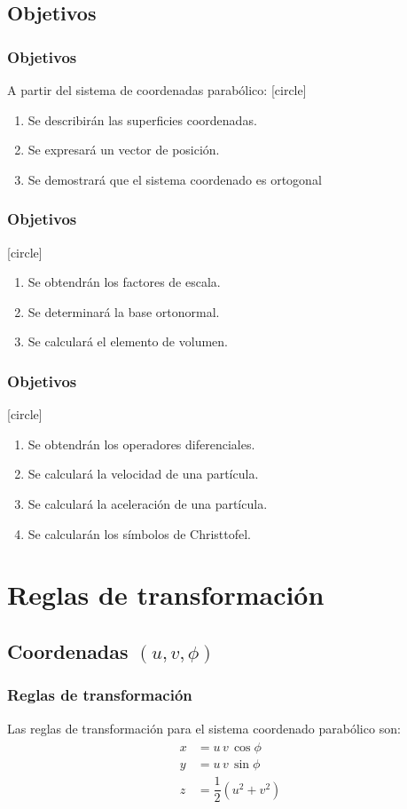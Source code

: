 \subsection{Objetivos}
\begin{frame}
\frametitle{Objetivos}
A partir del sistema de coordenadas parabólico:
[circle]
\begin{enumerate}[<+->]
\item Se describirán las superficies coordenadas.
\item Se expresará un vector de posición.
\item Se demostrará que el sistema coordenado es ortogonal
\seti
\end{enumerate}
\end{frame}
\begin{frame}
\frametitle{Objetivos}
[circle]
\begin{enumerate}[<+->]
\conti
\item Se obtendrán los factores de escala.
\item Se determinará la base ortonormal.
\item Se calculará el elemento de volumen.
\seti
\end{enumerate}
\end{frame}
\begin{frame}
\frametitle{Objetivos}
[circle]
\begin{enumerate}[<+->]
\conti
\item Se obtendrán los operadores diferenciales.
\item Se calculará la velocidad de una partícula.
\item Se calculará la aceleración de una partícula.
\item Se calcularán los símbolos de Christtofel.
\end{enumerate}
\end{frame}
\section{Reglas de transformación}
\subsection{Coordenadas \texorpdfstring{$(u, v, \phi)$}{(u, v, f)}}
\begin{frame}
\frametitle{Reglas de transformación}
Las reglas de transformación para el sistema coordenado parabólico son:
\begin{align}
\begin{aligned}
x &= u \, v \, \cos \phi \\[0.5em]
y &= u \, v \, \sin \phi \\[0.5em]
z &= \dfrac{1}{2} (u^{2} + v^{2})
\end{aligned}
\label{eq:ecuacion_01}
\end{align}
\end{frame}
